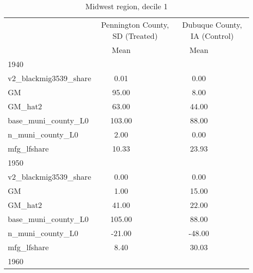 \begin{table}[htbp]\centering
\def\sym#1{\ifmmode^{#1}\else\(^{#1}\)\fi}
\caption{Midwest region, decile 1 \label{tab1}}
\begin{tabular}{l*{2}{ccc}}
\toprule
                    &\multicolumn{3}{c}{Pennington County, SD (Treated)}&\multicolumn{3}{c}{Dubuque County, IA (Control)}\\
                    &        Mean&            &            &        Mean&            &            \\
\midrule
1940                &            &            &            &            &            &            \\
v2\_blackmig3539\_share&        0.01&            &            &        0.00&            &            \\
GM                  &       95.00&            &            &        8.00&            &            \\
GM\_hat2             &       63.00&            &            &       44.00&            &            \\
base\_muni\_county\_L0 &      103.00&            &            &       88.00&            &            \\
n\_muni\_county\_L0    &        2.00&            &            &        0.00&            &            \\
mfg\_lfshare         &       10.33&            &            &       23.93&            &            \\
\midrule
1950                &            &            &            &            &            &            \\
v2\_blackmig3539\_share&        0.00&            &            &        0.00&            &            \\
GM                  &        1.00&            &            &       15.00&            &            \\
GM\_hat2             &       41.00&            &            &       22.00&            &            \\
base\_muni\_county\_L0 &      105.00&            &            &       88.00&            &            \\
n\_muni\_county\_L0    &      -21.00&            &            &      -48.00&            &            \\
mfg\_lfshare         &        8.40&            &            &       30.03&            &            \\
\midrule
1960                &            &            &            &            &            &            \\

\end{tabular}
\end{table}
